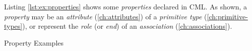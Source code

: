 Listing \ref{lst:ex:properties} shows some \emph{properties} declared in CML.
As shown,
a \emph{property} may be an \emph{attribute} (\ref{ch:attributes})
of a \emph{primitive type} (\ref{ch:primitive-types}),
or represent the \emph{role} (or \emph{end}) of an \emph{association} (\ref{ch:associations}).

\begin{code}
\verbatimfont{\small}

\caption{Property Examples}
\label{lst:ex:properties}
\end{code}

